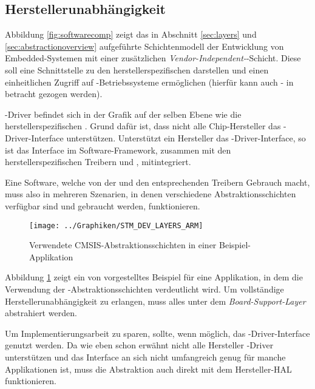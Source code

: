     \subsection{Herstellerunabhängigkeit}
    Abbildung \ref{fig:softwarecomp} zeigt das in Abschnitt \ref{sec:layers} und \ref{sec:abstractionoverview}
    aufgeführte Schichtenmodell der Entwicklung von Embedded-Systemen mit einer zusätzlichen
    \textit{Vendor-Independent-}-Schicht. Diese soll eine Schnittstelle zu den herstellerspezifischen
     darstellen und einen einheitlichen Zugriff auf -Betriebssysteme ermöglichen
    (hierfür kann auch - in betracht gezogen werden).

    -Driver befindet sich in der Grafik auf der selben Ebene wie die herstellerspezifischen . Grund dafür ist,
    dass nicht alle Chip-Hersteller das -Driver-Interface unterstützen. Unterstützt ein Hersteller das
    -Driver-Interface, so ist das Interface im Software-Framework, zusammen mit den herstellerspezifischen
    Treibern und , mitintegriert.

    Eine Software, welche von der  und den entsprechenden Treibern Gebrauch macht,
    muss also in mehreren Szenarien, in denen verschiedene Abstraktionsschichten verfügbar sind und gebraucht werden,
    funktionieren.


    \begin{figure}
        \centering
        \caption{Verwendete CMSIS-Abstraktionsschichten in einer Beispiel\hyp{}Applikation}
        \label{fig:armcmsisexampleapp}
        \texttt{[image: ../Graphiken/STM\_DEV\_LAYERS\_ARM]}
    \end{figure}

    Abbildung \ref{fig:armcmsisexampleapp} zeigt ein von  vorgestelltes Beispiel für eine Applikation, in
    dem die Verwendung der -Abstraktionsschichten verdeutlicht wird.
    Um vollständige Herstellerunabhängigkeit zu erlangen, muss alles unter dem \textit{Board-Support-Layer} abstrahiert werden.

    Um Implementierungsarbeit zu sparen, sollte, wenn möglich, das -Driver-Interface genutzt werden. Da wie eben
    schon erwähnt nicht alle Hersteller -Driver unterstützen und das Interface an sich nicht umfangreich genug für
    manche Applikationen ist, muss die Abstraktion auch direkt mit dem Hersteller-HAL funktionieren.

